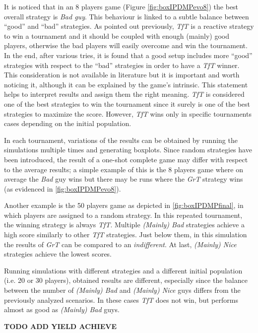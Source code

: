 \documentclass[journal,a4paper,10pt,twoside]{IEEEtran} %
\begin{document}
It is noticed that in an 8 players game (Figure \ref{fig:boxIPDMPevo8}) the best overall strategy is \textit{Bad guy}. This behaviour is linked to a subtle balance between ``good'' and ``bad'' strategies. As pointed out previously, \textit{TfT} is a reactive strategy to win a tournament and it should be coupled with enough (mainly) good players, otherwise the bad players will easily overcome and win the tournament. In the end, after various tries, it is found that a good setup includes more ``good'' strategies with respect to the ``bad'' strategies in order to have a \textit{TfT} winner. This consideration is not available in literature but it is important and worth noticing it, although it can be explained by the game's intrinsic. This statement helps to interpret results and assign them the right meaning. \textit{TfT} is considered one of the best strategies to win the tournament since it surely is one of the best strategies to maximize the score. However, \textit{TfT} wins only in specific tournaments cases depending on the initial population.

In each tournament, variations of the results can be obtained by running the simulations multiple times and generating boxplots.
Since random strategies have been introduced, the result of a one-shot complete game may differ with respect to the average results; a simple example of this is the 8 players game where on average the \textit{Bad} guy wins but there may be runs where the \textit{GrT} strategy wins (as evidenced in \autoref{fig:boxIPDMPevo8}).

Another example is the 50 players game as depicted in \autoref{fig:boxIPDMPfinal}, in which players are assigned to a random strategy. In this repeated tournament, the winning strategy is always \textit{TfT}. Multiple \textit{(Mainly) Bad} strategies achieve a high score similarly to other \textit{TfT} strategies. Just below them, in this simulation the results of \textit{GrT} can be compared to an \textit{indifferent}. At last, \textit{(Mainly) Nice} strategies achieve the lowest scores.

Running simulations with different strategies and a different initial population (i.e. 20 or 30 players), obtained results are different, especially since the balance between the number of \textit{(Mainly) Bad} and \textit{(Mainly) Nice} guys differs from the previously analyzed scenarios. In these cases \textit{TfT} does not win, but performs almost as good as \textit{(Mainly) Bad} guys.

\textbf{TODO ADD YIELD ACHIEVE}
\end{document}
